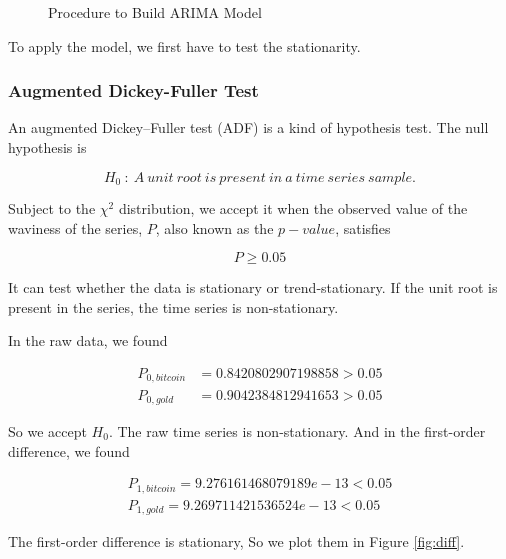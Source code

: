 \documentclass[12pt,a4paper]{article}
\begin{document}
\begin{spacing}{1.2}
 \begin{figure}[H]
 	\caption{Procedure to Build ARIMA Model}
 	\label{figure:flow_chart}
 \end{figure}


To apply the model, we first have to test the stationarity.

\subsubsection{Augmented Dickey-Fuller Test}

An augmented Dickey–Fuller test (ADF) is a kind of hypothesis test. The null hypothesis is 

$$
H_0 \ : \ A \ unit \ root \ is \ present \ in \ a \ time \ series \ sample.
$$

Subject to the $\chi^2$ distribution, we accept it when the observed value of the waviness of the series, $P$, also known as the $p-value$, satisfies

$$
P \ge 0.05
$$

It can test whether the data is stationary or trend-stationary. If the unit root is present in the series, the time series is non-stationary.

In the raw data, we found

\begin{align*}
	P_{0,bitcoin} &=0.8420802907198858 > 0.05 \\
	P_{0,gold} &=0.9042384812941653 > 0.05 
\end{align*}


So we accept $H_0$. The raw time series is non-stationary.
And in the first-order difference, we found


\begin{align*}
	P_{1,bitcoin}=9.276161468079189e-13 < 0.05 \\
	P_{1,gold}=9.269711421536524e-13 < 0.05
\end{align*}

The first-order difference is stationary, So we plot them in Figure \ref{fig:diff}. 


\end{spacing}
\end{document}
